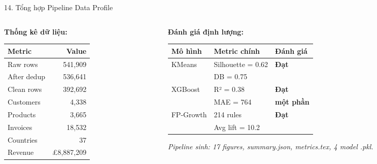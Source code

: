 \documentclass[10pt, aspectratio=169]{beamer}
\begin{document}
\begin{frame}{14. Tổng hợp Pipeline Data Profile}
    \small
    \begin{columns}[T]
        \begin{column}{0.42\textwidth}
            \textbf{Thống kê dữ liệu:}
            
            \begin{tabularx}{\linewidth}{Xr}
                \toprule
                \textbf{Metric} & \textbf{Value} \\
                \midrule
                Raw rows & 541,909 \\
                After dedup & 536,641 \\
                Clean rows & 392,692 \\
                Customers & 4,338 \\
                Products & 3,665 \\
                Invoices & 18,532 \\
                Countries & 37 \\
                Revenue & £8,887,209 \\
                \bottomrule
            \end{tabularx}
        \end{column}
        
        \begin{column}{0.54\textwidth}
            \textbf{Đánh giá định lượng:}
            
            \footnotesize
            \begin{tabularx}{\linewidth}{llX}
                \toprule
                \textbf{Mô hình} & \textbf{Metric chính} & \textbf{Đánh giá} \\
                \midrule
                KMeans & Silhouette = 0.62 & \textbf{Đạt} \\
                & DB = 0.75 & \\
                \midrule
                XGBoost & R² = 0.38 & \textbf{Đạt} \\
                & MAE = 764 & \textbf{một phần} \\
                \midrule
                FP-Growth & 214 rules & \textbf{Đạt} \\
                & Avg lift = 10.2 & \\
                \bottomrule
            \end{tabularx}
            
            \small
            \vspace{0.15cm}
            \textit{Pipeline sinh: 17 figures, summary.json, metrics.tex, 4 model .pkl.}
        \end{column}
    \end{columns}
\end{frame}
\end{document}

